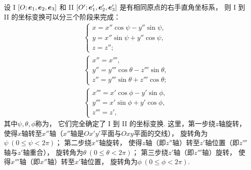 设 I \([O;\boldsymbol{e}_1,\boldsymbol{e}_2,\boldsymbol{e}_3]\)
和 II \([O';\boldsymbol{e}_1',\boldsymbol{e}_2',\boldsymbol{e}_3']\)
是有相同原点的右手直角坐标系，
则 I 到 II 的坐标变换可以分三个阶段来完成：\begin{gather*}
	\left\{ \begin{array}{l}
		x = x'' \cos\psi - y'' \sin\psi, \\
		y = x'' \sin\psi + y'' \cos\psi, \\
		z = z'';
	\end{array} \right. \\
	\left\{ \begin{array}{l}
		x'' = x''', \\
		y'' = y''' \cos\theta - z''' \sin\theta, \\
		z'' = y''' \sin\theta + z''' \cos\theta;
	\end{array} \right. \\
	\left\{ \begin{array}{l}
		x''' = x' \cos\phi - y' \sin\phi, \\
		y''' = x' \sin\phi + y' \cos\phi, \\
		z''' = z',
	\end{array} \right.
\end{gather*}
其中\(\psi,\theta,\phi\)称为，
它们完全确定了 I 到 II 的坐标变换.
这里，第一步绕\(z\)轴旋转，
使得\(x\)轴转至\(x''\)轴（\(x''\)轴是\(Ox'y'\)平面与\(Oxy\)平面的交线），
旋转角为\(\psi\ (0\leq\psi<2\pi)\)；
第二步绕\(x''\)轴旋转，
使得\(z\)轴（即\(z''\)轴）转至\(z'\)轴位置（即\(z'''\)轴与\(z'\)轴重合），
旋转角为\(\theta\ (0\leq\theta<2\pi)\)；
第三步绕\(z'\)轴（即\(z'''\)轴）旋转，
使得\(x'''\)轴（即\(x''\)轴）转至\(x'\)轴位置，
旋转角为\(\phi\ (0\leq\phi<2\pi)\).
